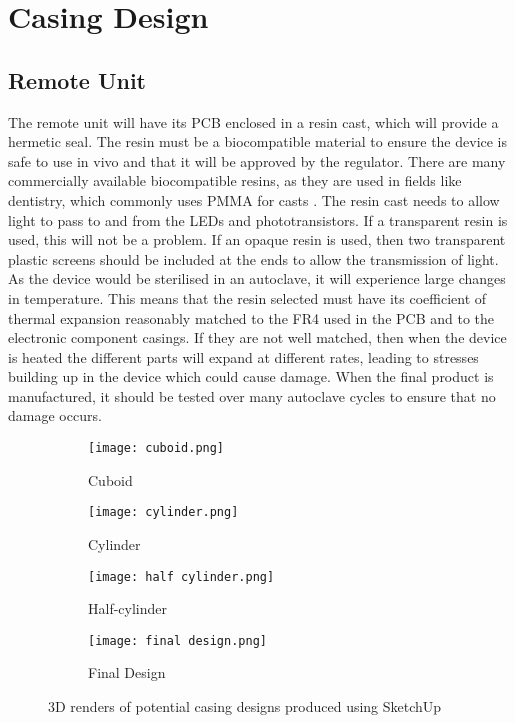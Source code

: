 \section{Casing Design}

\subsection{Remote Unit}
The remote unit will have its PCB enclosed in a resin cast, which will provide a hermetic seal. The resin must be a biocompatible material to ensure the device is safe to use in vivo and that it will be approved by the regulator. There are many commercially available biocompatible resins, as they are used in fields like dentistry, which commonly uses PMMA for casts \cite{biocompatible_resin}. The resin cast needs to allow light to pass to and from the LEDs and phototransistors. If a transparent resin is used, this will not be a problem. If an opaque resin is used, then two transparent plastic screens should be included at the ends to allow the transmission of light.\\

As the device would be sterilised in an autoclave, it will experience large changes in temperature. This means that the resin selected must have its coefficient of thermal expansion reasonably matched to the FR4 used in the PCB and to the electronic component casings. If they are not well matched, then when the device is heated the different parts will expand at different rates, leading to stresses building up in the device which could cause damage. When the final product is manufactured, it should be tested over many autoclave cycles to ensure that no damage occurs.\\

\begin{figure}[htb]
	\centering
	\begin{subfigure}[b]{0.4\linewidth}
		\texttt{[image: cuboid.png]}
		\caption{Cuboid}
		\label{fig: cuboid}
	\end{subfigure}
	\begin{subfigure}[b]{0.4\linewidth}
		\texttt{[image: cylinder.png]}
		\caption{Cylinder}
		\label{fig: cylinder}
	\end{subfigure}
	\begin{subfigure}[b]{0.4\linewidth}
		\texttt{[image: half cylinder.png]}
		\caption{Half-cylinder}
		\label{fig: half-cylinder}
	\end{subfigure}
	\begin{subfigure}[b]{0.4\linewidth}
		\texttt{[image: final design.png]}
		\caption{Final Design}
		\label{fig: final design}
	\end{subfigure}
	\caption{3D renders of potential casing designs produced using SketchUp \cite{sketchup}}
	\label{fig: casings}
\end{figure}


